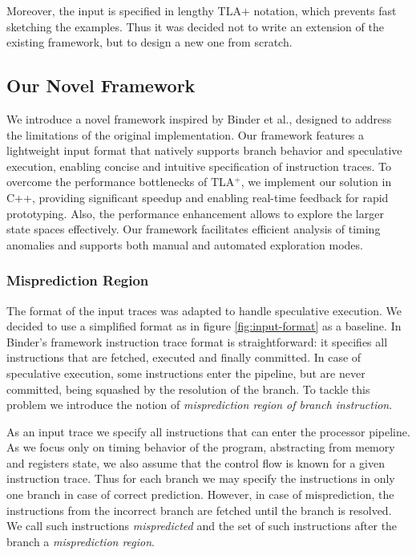 Moreover, the input is specified in lengthy TLA$+$ notation, which prevents fast sketching the examples. Thus it was decided not to write an extension of the existing framework, but to design a new one from scratch.

\subsection{Our Novel Framework}

We introduce a novel framework inspired by Binder et al., designed to address the limitations of the original implementation. Our framework features a lightweight input format that natively supports branch behavior and speculative execution, enabling concise and intuitive specification of instruction traces. To overcome the performance bottlenecks of TLA$^+$, we implement our solution in C++, providing significant speedup and enabling real-time feedback for rapid prototyping. Also, the performance enhancement allows to explore the larger state spaces effectively. Our framework facilitates efficient analysis of timing anomalies and supports both manual and automated exploration modes.

\subsubsection{Misprediction Region}

The format of the input traces was adapted to handle speculative execution. We decided to use a simplified format as in figure \ref{fig:input-format} as a baseline. In Binder's framework instruction trace format is straightforward: it specifies all instructions that are fetched, executed and finally committed. In case of speculative execution, some instructions enter the pipeline, but are never committed, being squashed by the resolution of the branch. To tackle this problem we introduce the notion of \textit{misprediction region of branch instruction}.

As an input trace we specify all instructions that can enter the processor pipeline. As we focus only on timing behavior of the program, abstracting from memory and registers state, we also assume that the control flow is known for a given instruction trace. Thus for each branch we may specify the instructions in only one branch in case of correct prediction. However, in case of misprediction, the instructions from the incorrect branch are fetched until the branch is resolved. We call such instructions \textit{mispredicted} and the set of such instructions after the branch a \textit{misprediction region}. 

